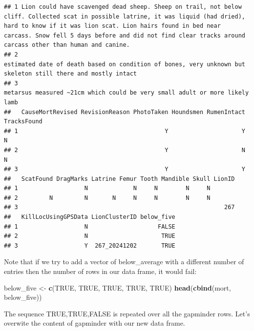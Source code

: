 \documentclass[
]{book}
\newenvironment{Shaded}{\begin{snugshade}}{\end{snugshade}}
\newcommand{\ConstantTok}[1]{\textcolor[rgb]{0.56,0.35,0.01}{#1}}
\newcommand{\FunctionTok}[1]{\textcolor[rgb]{0.13,0.29,0.53}{\textbf{#1}}}
\newcommand{\NormalTok}[1]{#1}
\newcommand{\OtherTok}[1]{\textcolor[rgb]{0.56,0.35,0.01}{#1}}
\begin{document}
\begin{verbatim}
## 1 Lion could have scavenged dead sheep. Sheep on trail, not below cliff. Collected scat in possible latrine, it was liquid (had dried), hard to know if it was lion scat. Lion hairs found in bed near carcass. Snow fell 5 days before and did not find clear tracks around carcass other than human and canine.
## 2                                                                                                                                                                                                    estimated date of death based on condition of bones, very unknown but skeleton still there and mostly intact
## 3                                                                                                                                                                                                                                     metarsus measured ~21cm which could be very small adult or more likely lamb
##   CauseMortRevised RevisionReason PhotoTaken Houndsmen RumenIntact TracksFound
## 1                                          Y                     Y           N
## 2                                          Y                     N           N
## 3                                          Y                     Y            
##   ScatFound DragMarks Latrine Femur Tooth Mandible Skull LionID
## 1                   N             N     N        N     N       
## 2         N         N       N     N     N        N     N       
## 3                                                           267
##   KillLocUsingGPSData LionClusterID below_five
## 1                   N                    FALSE
## 2                   N                     TRUE
## 3                   Y  267_20241202       TRUE
\end{verbatim}

Note that if we try to add a vector of below\_average with a different number of entries then the number of rows in our data frame, it would fail:

\begin{Shaded}
\begin{Highlighting}[]
\NormalTok{below\_five }\OtherTok{\textless{}{-}} \FunctionTok{c}\NormalTok{(}\ConstantTok{TRUE}\NormalTok{, }\ConstantTok{TRUE}\NormalTok{, }\ConstantTok{TRUE}\NormalTok{, }\ConstantTok{TRUE}\NormalTok{, }\ConstantTok{TRUE}\NormalTok{)}
\FunctionTok{head}\NormalTok{(}\FunctionTok{cbind}\NormalTok{(mort, below\_five))}
\end{Highlighting}
\end{Shaded}

The sequence TRUE,TRUE,FALSE is repeated over all the gapminder rows. Let's overwite the content of gapminder with our new data frame.
\end{document}

